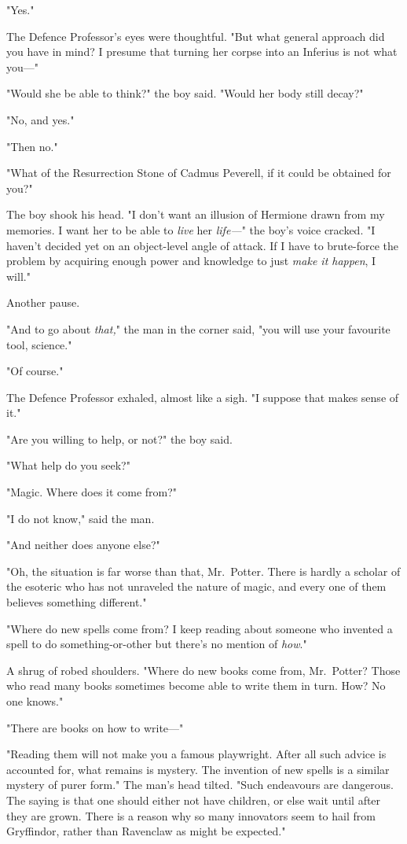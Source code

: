 "Yes."

The Defence Professor's eyes were thoughtful. "But what general approach did
you have in mind? I presume that turning her corpse into an Inferius is not
what you---"

"Would she be able to think?" the boy said. "Would her body still decay?"

"No, and yes."

"Then no."

"What of the Resurrection Stone of Cadmus Peverell, if it could be obtained for
you?"

The boy shook his head. "I don't want an illusion of Hermione drawn from my
memories. I want her to be able to \emph{live} her \emph{life---}" the boy's
voice cracked. "I haven't decided yet on an object-level angle of attack. If I
have to brute-force the problem by acquiring enough power and knowledge to just
\emph{make it happen}, I will."

Another pause.

"And to go about \emph{that,}" the man in the corner said, "you will use your
favourite tool, science."

"Of course."

The Defence Professor exhaled, almost like a sigh. "I suppose that makes sense
of it."

"Are you willing to help, or not?" the boy said.

"What help do you seek?"

"Magic. Where does it come from?"

"I do not know," said the man.

"And neither does anyone else?"

"Oh, the situation is far worse than that, Mr.~Potter. There is hardly a
scholar of the esoteric who has not unraveled the nature of magic, and every
one of them believes something different."

"Where do new spells come from? I keep reading about someone who invented a
spell to do something-or-other but there's no mention of \emph{how}."

A shrug of robed shoulders. "Where do new books come from, Mr.~Potter? Those
who read many books sometimes become able to write them in turn. How? No one
knows."

"There are books on how to write---"

"Reading them will not make you a famous playwright. After all such advice is
accounted for, what remains is mystery. The invention of new spells is a
similar mystery of purer form." The man's head tilted. "Such endeavours are
dangerous. The saying is that one should either not have children, or else wait
until after they are grown. There is a reason why so many innovators seem to
hail from Gryffindor, rather than Ravenclaw as might be expected."

